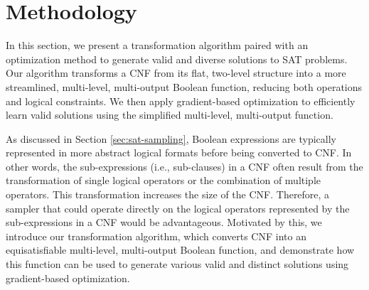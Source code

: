 \section{Methodology}


In this section, we present a transformation algorithm paired with an optimization method to generate valid and diverse solutions to SAT problems. Our algorithm transforms a CNF from its flat, two-level structure into a more streamlined, multi-level, multi-output Boolean function, reducing both operations and logical constraints. We then apply gradient-based optimization to efficiently learn valid solutions using the simplified multi-level, multi-output function.

As discussed in Section \ref{sec:sat-sampling}, Boolean expressions are typically represented in more abstract logical formats before being converted to CNF. In other words, the sub-expressions (i.e., sub-clauses) in a CNF often result from the transformation of single logical operators or the combination of multiple operators. This transformation increases the size of the CNF. Therefore, a sampler that could operate directly on the logical operators represented by the sub-expressions in a CNF would be advantageous. Motivated by this, we introduce our transformation algorithm, which converts CNF into an equisatisfiable multi-level, multi-output Boolean function, and demonstrate how this function can be used to generate various valid and distinct solutions using gradient-based optimization.


